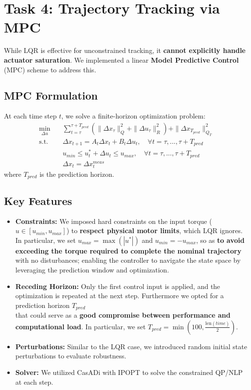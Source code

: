 

\section{Task 4: Trajectory Tracking via MPC}

While LQR is effective for unconstrained tracking, it \textbf{cannot explicitly handle actuator saturation}. We implemented a linear \textbf{Model Predictive Control} (MPC) scheme to address this.

\subsection{MPC Formulation}
At each time step $t$, we solve a finite-horizon optimization problem:
\begin{align*}
\min_{\Delta u} \quad & \sum_{t=\tau}^{\tau + T_{pred}} \left( \|\Delta x_{\tau}\|_{Q}^2 + \|\Delta u_{\tau}\|_{R}^2 \right) + \|\Delta x_{T_{pred}}\|_{Q_T}^2 \\
\text{s.t.} \quad & \Delta x_{t+1} = A_{t} \Delta x_t + B_{t} \Delta u_t, \quad \forall t = \tau, ..., \tau + T_{pred}   \\
& u_{min} \leq u^*_t + \Delta u_t \leq u_{max}, \quad \forall t = \tau, ..., \tau + T_{pred}   \\
& \Delta x_t =\Delta x_t^{meas}
\end{align*}
where $T_{pred}$ is the prediction horizon.

\subsection{Key Features}
\begin{itemize}
\item \textbf{Constraints:} We imposed hard constraints on the input torque ($u \in [u_{min}, u_{max}]$) to \textbf{respect physical motor limits}, which LQR ignores. \\
In particular, we set $u_{max} = \max(|u^*|)$ and $u_{min} = -u_{max}$, so as \textbf{to avoid exceeding the torque required to complete the nominal trajectory} with no disturbances; enabling the controller to navigate the state space by 
leveraging the prediction window and optimization. 

\item \textbf{Receding Horizon:} Only the first control input is applied, and the optimization is repeated at the next step. Furthermore we opted for a prediction horizon $T_{pred}$\\
that could serve as a \textbf{good compromise between performance and computational load}. In particular, we set $T_{pred} = \min(100, \frac{\text{len}(time)}{2})$.
\item \textbf{Perturbations:} Similar to the LQR case, we introduced random initial state perturbations to evaluate robustness. 
\item \textbf{Solver:} We utilized CasADi with IPOPT to solve the constrained QP/NLP at each step.
\end{itemize}

